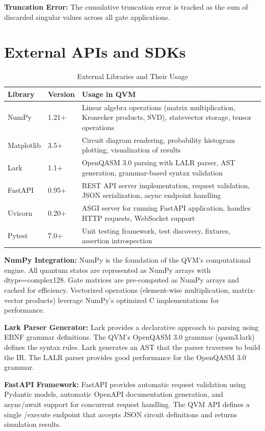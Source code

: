 \textbf{Truncation Error:} The cumulative truncation error is tracked as the sum of discarded singular values across all gate applications.

\section{External APIs and SDKs}

\begin{table}[h]
\centering
\caption{External Libraries and Their Usage}
\begin{tabular}{|p{3cm}|p{3cm}|p{7cm}|}
\hline
\textbf{Library} & \textbf{Version} & \textbf{Usage in QVM} \\
\hline
NumPy & 1.21+ & Linear algebra operations (matrix multiplication, Kronecker products, SVD), statevector storage, tensor operations \\
\hline
Matplotlib & 3.5+ & Circuit diagram rendering, probability histogram plotting, visualization of results \\
\hline
Lark & 1.1+ & OpenQASM 3.0 parsing with LALR parser, AST generation, grammar-based syntax validation \\
\hline
FastAPI & 0.95+ & REST API server implementation, request validation, JSON serialization, async endpoint handling \\
\hline
Uvicorn & 0.20+ & ASGI server for running FastAPI application, handles HTTP requests, WebSocket support \\
\hline
Pytest & 7.0+ & Unit testing framework, test discovery, fixtures, assertion introspection \\
\hline
\end{tabular}
\end{table}

\textbf{NumPy Integration:}
NumPy is the foundation of the QVM's computational engine. All quantum states are represented as NumPy arrays with dtype=complex128. Gate matrices are pre-computed as NumPy arrays and cached for efficiency. Vectorized operations (element-wise multiplication, matrix-vector products) leverage NumPy's optimized C implementations for performance.

\textbf{Lark Parser Generator:}
Lark provides a declarative approach to parsing using EBNF grammar definitions. The QVM's OpenQASM 3.0 grammar (qasm3.lark) defines the syntax rules. Lark generates an AST that the parser traverses to build the IR. The LALR parser provides good performance for the OpenQASM 3.0 grammar.

\textbf{FastAPI Framework:}
FastAPI provides automatic request validation using Pydantic models, automatic OpenAPI documentation generation, and async/await support for concurrent request handling. The QVM API defines a single /execute endpoint that accepts JSON circuit definitions and returns simulation results.

